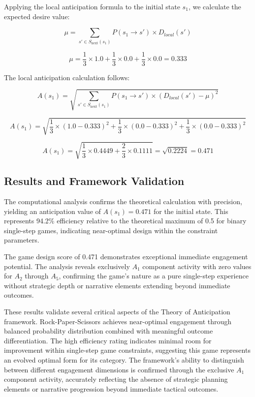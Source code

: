 \documentclass{article}
\begin{document}
Applying the local anticipation formula to the initial state $s_1$, we calculate the expected desire value:

\[
\mu = \sum_{s' \in S_{\text{next}}(s_1)} P(s_1 \rightarrow s') \times D_{local}(s')
\]

\[
\mu = \frac{1}{3} \times 1.0 + \frac{1}{3} \times 0.0 + \frac{1}{3} \times 0.0 = 0.333
\]

The local anticipation calculation follows:

\[
A(s_1) = \sqrt{\sum_{s' \in S_{\text{next}}(s_1)} P(s_1 \rightarrow s') \times (D_{local}(s') - \mu)^2}
\]

\[
A(s_1) = \sqrt{\frac{1}{3} \times (1.0 - 0.333)^2 + \frac{1}{3} \times (0.0 - 0.333)^2 + \frac{1}{3} \times (0.0 - 0.333)^2}
\]

\[
A(s_1) = \sqrt{\frac{1}{3} \times 0.4449 + \frac{2}{3} \times 0.1111} = \sqrt{0.2224} = 0.471
\]

\subsection{Results and Framework Validation}

The computational analysis confirms the theoretical calculation with precision, yielding an anticipation value of $A(s_1) = 0.471$ for the initial state. This represents 94.2\% efficiency relative to the theoretical maximum of 0.5 for binary single-step games, indicating near-optimal design within the constraint parameters.

The game design score of 0.471 demonstrates exceptional immediate engagement potential. The analysis reveals exclusively $A_1$ component activity with zero values for $A_2$ through $A_5$, confirming the game's nature as a pure single-step experience without strategic depth or narrative elements extending beyond immediate outcomes.

These results validate several critical aspects of the Theory of Anticipation framework. Rock-Paper-Scissors achieves near-optimal engagement through balanced probability distribution combined with meaningful outcome differentiation. The high efficiency rating indicates minimal room for improvement within single-step game constraints, suggesting this game represents an evolved optimal form for its category. The framework's ability to distinguish between different engagement dimensions is confirmed through the exclusive $A_1$ component activity, accurately reflecting the absence of strategic planning elements or narrative progression beyond immediate tactical outcomes.
\end{document}
